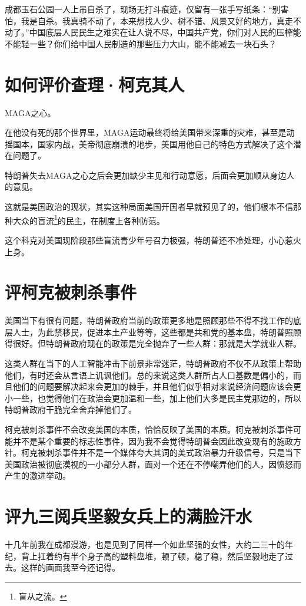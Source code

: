 \documentclass[12pt,oneside]{book}
\begin{document}
成都玉石公园一人上吊自杀了，现场无打斗痕迹，仅留有一张手写纸条：“别害怕，我是自杀。我真骑不动了，本来想找人少、树不错、风景又好的地方，真走不动了。”中国底层人民民生之难实在让人说不尽，中国共产党，你们对人民的压榨能不能轻一些？你们给中国人民制造的那些压力大山，能不能减去一块石头？


\chapter{如何评价查理·柯克其人}
MAGA之心。

在他没有死的那个世界里，MAGA运动最终将给美国带来深重的灾难，甚至是动摇国本，国家内战，美帝彻底崩溃的地步，美国用他自己的特色方式解决了这个潜在问题了。

特朗普失去MAGA之心之后会更加缺少主见和行动意愿，后面会更加顺从身边人的意见。

这就是美国政治的现状，其实这种局面美国开国者早就预见了的，他们根本不信那种大众的盲流\footnote{盲从之流。}的民主，在制度上各种防范。

这个科克对美国现阶段那些盲流青少年号召力极强，特朗普还不冷处理，小心惹火上身。



\chapter{评柯克被刺杀事件}
美国当下有很有问题，特朗普政府当前的政策更多地是照顾那些不得不找工作的底层人士，为此禁移民，促进本土产业等等，这些都是共和党的基本盘，特朗普照顾得很好。但特朗普政府现在的政策是完全抛弃了一些人群：那就是大学就业人群。

这类人群在当下的人工智能冲击下前景非常迷茫，特朗普政府不仅不从政策上帮助他们，有时还会从言语上讥讽他们。总的来说这类人群所占人口基数是偏小的，而且他们的问题要解决起来会更加的棘手，并且他们似乎相对来说经济问题应该会更小一些，也觉得他们在政治会更加温和一些，加上他们大多是民主党那边的，所以特朗普政府干脆完全舍弃掉他们了。

柯克被刺杀事件不会改变美国的本质，恰恰反映了美国的本质。柯克被刺杀事件可能并不是某个重要的标志性事件，因为我不会觉得特朗普会因此改变现有的施政方针。柯克被刺杀事件并不是一个媒体夸大其词的美式政治暴力升级信号，只是当下美国政治被彻底漠视的一小部分人群，面对一个还在不停嘲弄他们的人，因愤怒而产生的激进举动。



\chapter{评九三阅兵坚毅女兵上的满脸汗水}
十几年前我在成都漫游，也是见到了同样一个如此坚强的女性，大约二三十的年纪，背上扛着约有半个身子高的塑料盘堆，顿了顿，稳了稳，然后坚毅地走了过去。这样的画面我至今还记得。
\end{document}
